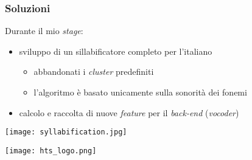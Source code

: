 \begin{frame}
\frametitle{Soluzioni}
  Durante il mio \textit{stage}:
  \begin{itemize}
    \item sviluppo di un sillabificatore completo per l'italiano
       \begin{itemize}
         \item abbandonati i \textit{cluster} predefiniti
         \item l'algoritmo è basato unicamente sulla sonorità
               dei fonemi
       \end{itemize}
    \item calcolo e raccolta di nuove \textit{feature} per il \textit{back-end} 
      (\textit{vocoder})
  \end{itemize}
  
  \begin{flushright}
  \texttt{[image: syllabification.jpg]}
  \end{flushright}
  
  \begin{flushleft}
  \texttt{[image: hts\_logo.png]}
  \end{flushleft}
  
  
\end{frame}
